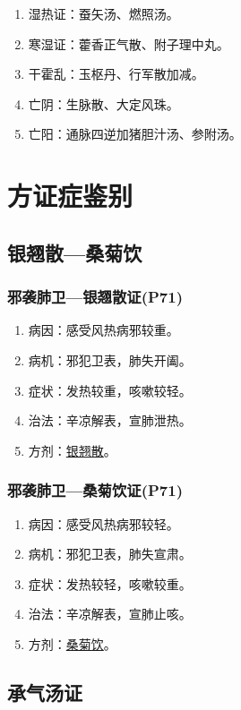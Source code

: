 \documentclass[cn,black,12pt,founder,normal,twocolumn]{elegantnote}
\begin{document}
\begin{enumerate}
    \item 湿热证：蚕矢汤、燃照汤。
    \item 寒湿证：藿香正气散、附子理中丸。
    \item 干霍乱：玉枢丹、行军散加减。
    \item 亡阴：生脉散、大定风珠。
    \item 亡阳：通脉四逆加猪胆汁汤、参附汤。
\end{enumerate}

\section{方证症鉴别}

\subsection{银翘散—桑菊饮}

\subsubsection{邪袭肺卫—银翘散证(P71)}

\begin{enumerate}
    \item 病因：感受风热病邪较重。
    \item 病机：邪犯卫表，肺失开阖。
    \item 症状：发热较重，咳嗽较轻。
    \item 治法：辛凉解表，宣肺泄热。
    \item 方剂：\uline{银翘散}。
\end{enumerate}

\subsubsection{邪袭肺卫—桑菊饮证(P71)}

\begin{enumerate}
    \item 病因：感受风热病邪较轻。
    \item 病机：邪犯卫表，肺失宣肃。
    \item 症状：发热较轻，咳嗽较重。
    \item 治法：辛凉解表，宣肺止咳。
    \item 方剂：\uline{桑菊饮}。
\end{enumerate}

\subsection{承气汤证}
\end{document}
